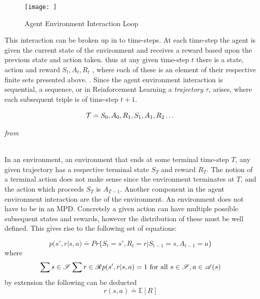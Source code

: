 \begin{figure}[h!]
    \centering
    \texttt{[image: ]}
    \caption{Agent Environment Interaction Loop}
    \label{fig:agent_env_inter}
\end{figure}

\noindent
This interaction can be broken up in to time-steps. At each time-step the agent is given the current state of the environment and receives a reward based upon the previous state and action taken. thus at any given time-step $t$ there is a state, action and reward $S_t, A_t, R_t$ , where each of these is an element of their respective finite sets presented above. . Since the agent environment interaction is sequential, a sequence, or in Reinforcement Learning a \textit{trajectory} $\tau$, arises, where each subsequent triple is of time-step $t+1$. 

\begin{equation}\label{MDP:trajectory}
    \mathcal{T} = S_0, A_0, R_1, S_1, A_1, R_2 \dots
\end{equation}
\centerline{\small\textit{from }}

\noindent
\\ In an  environment, an environment that ends at some terminal time-step $T$, any given trajectory has a respective terminal state $S_T$ and reward $R_T$. The notion of a terminal action does not make sense since the environment terminates at $T$, and the action which proceeds $S_T$ is $A_{T-1}$. Another component in the agent environment interaction are the  of the environment. An environment does not have to be  in an MPD. Concretely a given action can have multiple possible subsequent states and rewards, however the distribution of these must be well defined. This gives rise to the following set of equations:

\begin{equation}\label{MDP:prob_dist:0}
    p(s', r |s, a) \doteq Pr\{ S_t=s', R_t=r | S_{t-1}=s, A_{t-1}=a\}
\end{equation}
where 
\begin{equation}\label{MDP:prob_dist:1}
    \sum{s \in \mathscr{S}}^{}\sum{r \in \mathscr{R}}^{}  p(s', r |s, a) = 1 \mathrm{\ for\ all\ } s \in \mathscr{S}, a \in \mathscr{A}(s) 
\end{equation}
by extension the following can be deducted
\begin{equation}\label{MDP:prob_dist:2}
    r(s, a) \doteq \mathbb{E}[R]
\end{equation}

